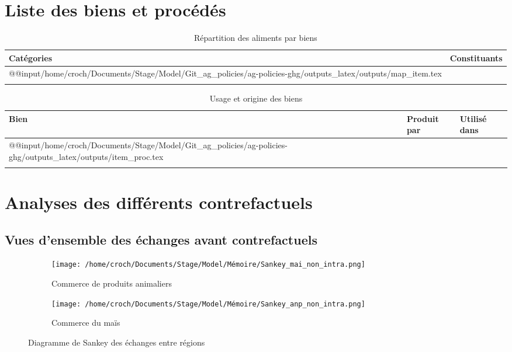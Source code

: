 \section{Liste des biens et procédés}\label{annexe:item_pord}

\begin{longtable}[h]{p{1.5in}p{4.5in}}
    \textbf{Catégories} & \textbf{Constituants} \\         \hline
    \endfirsthead
    \endhead
    \csname @@input\endcsname /home/croch/Documents/Stage/Model/Git_ag_policies/ag-policies-ghg/outputs_latex/outputs/map_item.tex
    \hline                                      \\
    \caption{Répartition des aliments par biens}
\end{longtable}

\begin{longtable}[h]{p{1.5in}p{2.5in}p{1.8in}}
    \textbf{Bien} & \textbf{Produit par} & \textbf{Utilisé dans} \\         \hline
    \endfirsthead
    \endhead
    \csname @@input\endcsname /home/croch/Documents/Stage/Model/Git_ag_policies/ag-policies-ghg/outputs_latex/outputs/item_proc.tex
    \hline                                                       \\
    \caption{Usage et origine des biens}
\end{longtable}

\newpage
\section{Analyses des différents contrefactuels}
\subsection{Vues d'ensemble des échanges avant contrefactuels}\label{annexe:sankey}

\begin{figure}[hbt!]
    \centering
    \begin{subfigure}[b]{0.495\textwidth}
        \centering
        \texttt{[image: /home/croch/Documents/Stage/Model/Mémoire/Sankey\_mai\_non\_intra.png]}
        \caption{Commerce de produits animaliers}
        \label{fig:sankey_anp}
    \end{subfigure}
    \begin{subfigure}[b]{0.495\textwidth}
        \centering
        \texttt{[image: /home/croch/Documents/Stage/Model/Mémoire/Sankey\_anp\_non\_intra.png]}
        \caption{Commerce du maïs}
        \label{fig:sankey_mai}
    \end{subfigure}
    \caption{Diagramme de Sankey des échanges entre régions}
    \label{fig:sankey_mai}
\end{figure}



